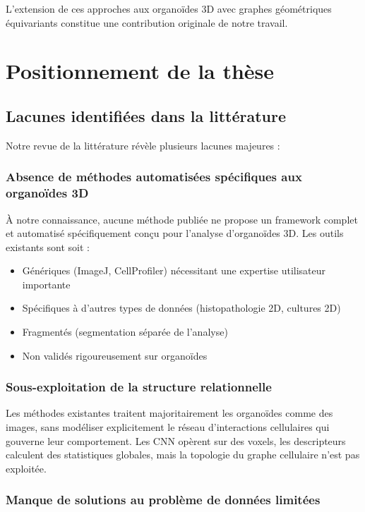 L'extension de ces approches aux organoïdes 3D avec graphes géométriques équivariants constitue une contribution originale de notre travail.

\section{Positionnement de la thèse}

\subsection{Lacunes identifiées dans la littérature}

Notre revue de la littérature révèle plusieurs lacunes majeures :

\subsubsection{Absence de méthodes automatisées spécifiques aux organoïdes 3D}

À notre connaissance, aucune méthode publiée ne propose un framework complet et automatisé spécifiquement conçu pour l'analyse d'organoïdes 3D. Les outils existants sont soit :
\begin{itemize}
    \item Génériques (ImageJ, CellProfiler) nécessitant une expertise utilisateur importante
    \item Spécifiques à d'autres types de données (histopathologie 2D, cultures 2D)
    \item Fragmentés (segmentation séparée de l'analyse)
    \item Non validés rigoureusement sur organoïdes
\end{itemize}

\subsubsection{Sous-exploitation de la structure relationnelle}

Les méthodes existantes traitent majoritairement les organoïdes comme des images, sans modéliser explicitement le réseau d'interactions cellulaires qui gouverne leur comportement. Les CNN opèrent sur des voxels, les descripteurs calculent des statistiques globales, mais la topologie du graphe cellulaire n'est pas exploitée.

\subsubsection{Manque de solutions au problème de données limitées}

